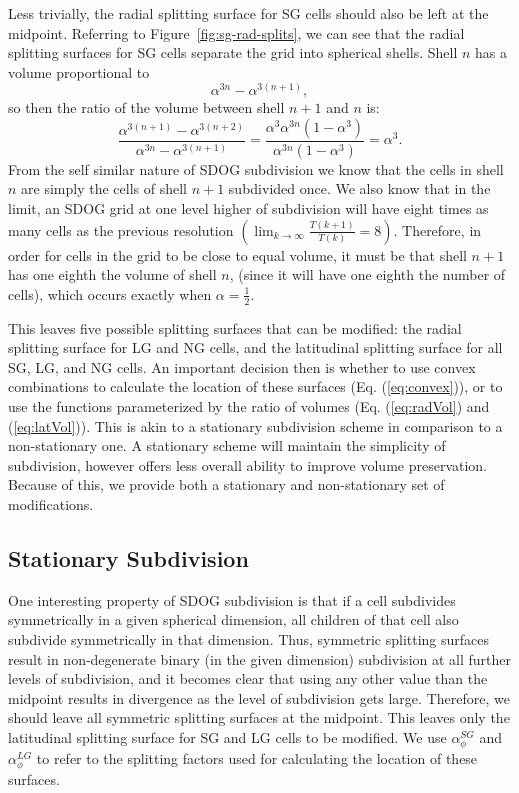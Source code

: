 Less trivially, the radial splitting surface for SG cells should also be left at the midpoint. Referring to Figure~\ref{fig:sg-rad-splits}, we can see that the radial splitting surfaces for SG cells separate the grid into spherical shells. Shell $n$ has a volume proportional to
%
\begin{equation}
\alpha^{3n} - \alpha^{3 \left( n + 1 \right)},
\end{equation}%
%
so then the ratio of the volume between shell $n+1$ and $n$ is:
%
\begin{equation}
\frac{ \alpha^{3 \left(n + 1 \right)} - \alpha^{3\left( n + 2 \right)} }{ \alpha^{3n} - \alpha^{3 \left( n + 1 \right)} } = \frac{ \alpha^{3} \alpha^{3n} \left( 1 - \alpha^{3} \right) }{ \alpha^{3n} \left( 1 - \alpha^{3} \right) } = \alpha^{3}.
\end{equation}%
%
From the self similar nature of SDOG subdivision we know that the cells in shell $n$ are simply the cells of shell $n+1$ subdivided once. We also know that in the limit, an SDOG grid at one level higher of subdivision will have eight times as many cells as the previous resolution $\left( \lim_{k \to \infty} \frac{ T(k+1) }{ T(k) }  = 8 \right)$. Therefore, in order for cells in the grid to be close to equal volume, it must be that shell $n+1$ has one eighth the volume of shell $n$, (since it will have one eighth the number of cells), which occurs exactly when $\alpha = \frac{1}{2}$.

This leaves five possible splitting surfaces that can be modified: the radial splitting surface for LG and NG cells, and the latitudinal splitting surface for all SG, LG, and NG cells. An important decision then is whether to use convex combinations to calculate the location of these surfaces (Eq. (\ref{eq:convex})), or to use the functions parameterized by the ratio of volumes (Eq. (\ref{eq:radVol}) and (\ref{eq:latVol})). This is akin to a stationary subdivision scheme in comparison to a non-stationary one. A stationary scheme will maintain the simplicity of subdivision, however offers less overall ability to improve volume preservation. Because of this, we provide both a stationary and non-stationary set of modifications. 

\subsection{Stationary Subdivision} \label{sec:stationary}
One interesting property of SDOG subdivision is that if a cell subdivides symmetrically in a given spherical dimension, all children of that cell also subdivide symmetrically in that dimension. Thus, symmetric splitting surfaces result in non-degenerate binary (in the given dimension) subdivision at all further levels of subdivision, and it becomes clear that using any other value than the midpoint results in divergence as the level of subdivision gets large. Therefore, we should leave all symmetric splitting surfaces at the midpoint. This leaves only the latitudinal splitting surface for SG and LG cells to be modified. We use $\alpha_{\phi}^{SG}$ and $\alpha_{\phi}^{LG}$ to refer to the splitting factors used for calculating the location of these surfaces. 



